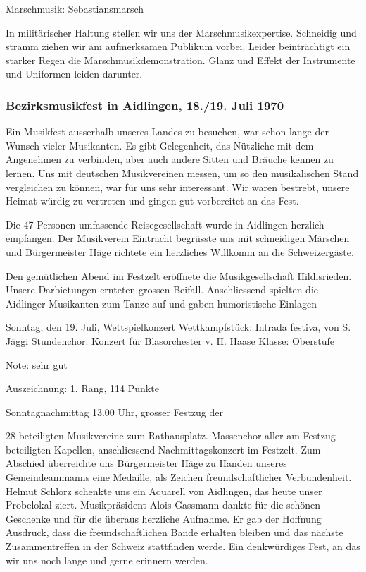 \begin{history}
    Marschmusik: Sebastiansmarsch

    In militärischer Haltung stellen wir uns der Marschmusikexpertise. Schneidig
    und stramm ziehen wir am aufmerksamen Publikum vorbei. Leider beinträchtigt
    ein starker Regen die Marschmusikdemonstration. Glanz und Effekt der
    Instrumente und Uniformen leiden darunter.

    \subsubsection{Bezirksmusikfest in Aidlingen, 18./19. Juli 1970}

    Ein Musikfest ausserhalb unseres Landes zu besuchen, war schon lange der
    Wunsch vieler Musikanten. Es gibt Gelegenheit, das Nützliche mit dem
    Angenehmen zu verbinden, aber auch andere Sitten und Bräuche kennen zu
    lernen. Uns mit deutschen Musikvereinen messen, um so den musikalischen
    Stand vergleichen zu können, war für uns sehr interessant. Wir waren
    bestrebt, unsere Heimat würdig zu vertreten und gingen gut vorbereitet an
    das Fest.

    Die 47 Personen umfassende Reisegesellschaft wurde in Aidlingen
    herzlich empfangen. Der Musikverein Eintracht begrüsste uns mit schneidigen
    Märschen und Bürgermeister Häge richtete ein herzliches Willkomm an die
    Schweizergäste.

    Den gemütlichen Abend im Festzelt eröffnete die Musikgesellschaft
    Hildisrieden. Unsere Darbietungen ernteten grossen Beifall. Anschliessend
    spielten die Aidlinger Musikanten zum Tanze auf und gaben humoristische
    Einlagen

    Sonntag, den 19. Juli, Wettspielkonzert Wettkampfstück: Intrada festiva, von
    S. Jäggi Stundenchor: Konzert für Blasorchester v. H. Haase Klasse:
    Oberstufe

    Note: sehr gut

    Auszeichnung: 1. Rang, 114 Punkte

    Sonntagnachmittag 13.00 Uhr, grosser Festzug der

    28 beteiligten Musikvereine zum Rathausplatz. Massenchor aller am Festzug
    beteiligten Kapellen, anschliessend Nachmittagskonzert im Festzelt. Zum
    Abschied überreichte uns Bürgermeister Häge zu Handen unseres
    Gemeindeammanns eine Medaille, als Zeichen freundschaftlicher Verbundenheit.
    Helmut Schlorz schenkte uns ein Aquarell von Aidlingen, das heute unser
    Probelokal ziert. Musikpräsident Alois Gassmann dankte für die schönen
    Geschenke und für die überaus herzliche Aufnahme. Er gab der Hoffnung
    Ausdruck, dass die freundschaftlichen Bande erhalten bleiben und das nächste
    Zusammentreffen in der Schweiz stattfinden werde. Ein denkwürdiges Fest, an
    das wir uns noch lange und gerne erinnern werden.


\end{history}